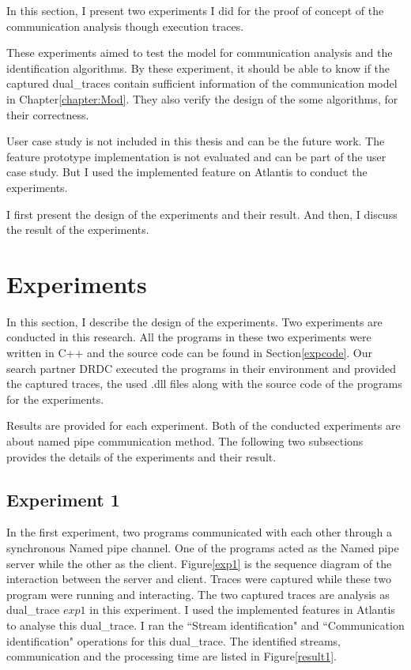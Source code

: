 


\label{chapter:Exp}
In this section, I present two experiments I did for the proof of concept of the communication analysis though execution traces.

These experiments aimed to test the model for communication analysis and the identification algorithms. By these experiment, it should be able to know if the captured dual\_traces contain sufficient information of the communication model in Chapter\ref{chapter:Mod}. They also verify the design of the some algorithms, for their correctness.  

User case study is not included in this thesis and can be the future work. The feature prototype implementation is not evaluated and can be part of the user case study. But I used the implemented feature on Atlantis to conduct the experiments.

I first present the design of the experiments and their result. And then, I discuss the result of the experiments.  

\section{Experiments}
In this section, I describe the design of the experiments. Two experiments are conducted in this research. All the programs in these two experiments were written in C++ and the source code can be found in Section\ref{expcode}. Our search partner DRDC executed the programs in their environment and provided the captured traces, the used .dll files along with the source code of the programs for the experiments.

Results are provided for each experiment. Both of the conducted experiments are about named pipe communication method. The following two subsections provides the details of the experiments and their result.

\subsection{Experiment 1}
In the first experiment, two programs communicated with each other through a synchronous Named pipe channel. One of the programs acted as the Named pipe server while the other as the client. Figure\ref{exp1} is the sequence diagram of the interaction between the server and client. Traces were captured while these two program were running and interacting. The two captured traces are analysis as dual\_trace $exp1$ in this experiment. I used the implemented features in Atlantis to analyse this dual\_trace. I ran the ``Stream identification" and ``Communication identification" operations for this dual\_trace. The identified streams, communication and the processing time are listed in Figure\ref{result1}.

